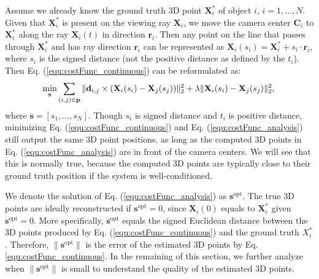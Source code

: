 Assume we already know the ground truth 3D point $\mathbf{{X}}_i^*$ of object $i$, $i=1,\dots,N$. Given that $\mathbf{{X}}_i^*$ is present on the viewing ray $\mathbf{X}_i$, we move the camera center $\mathbf{C}_i$ to $\mathbf{X}_i^*$ along the ray $\mathbf{X}_i(t)$ in direction $\mathbf{r}_i$. Then any point on the line that passes through $\mathbf{X}_i^*$ and has ray direction $\mathbf{r}_i$ can be represented as $\mathbf{X}_i (s_i)= \mathbf{X}_i^* + s_i \cdot \mathbf{r}_i$, where $s_i$ is the signed distance (not the positive distance as defined by the $t_i$). Then Eq. (\ref{equ:costFunc_continuous}) can be reformulated as:
\begin{equation}
\label{equ:costFunc_analysis}
\underset{\mathbf{s}} { \text{min} }
\sum_{(i,j)\in{\mathbf{p}}}{\|\mathbf{d}_{i,j}\times(\mathbf{X}_i(s_i)-\mathbf{X}_j(s_j))\|_2^2 + \lambda\|\mathbf{X}_i(s_i)-\mathbf{X}_j(s_j)\|_2^2}, \\
\end{equation}
where $\mathbf{s}=[s_1, \dots, s_N]$. Though $s_i$ is signed distance and $t_i$ is positive distance, minimizing Eq. (\ref{equ:costFunc_continuous}) and Eq. (\ref{equ:costFunc_analysis}) still output the same 3D point positions, as long as the computed 3D points in Eq. (\ref{equ:costFunc_analysis}) are in front of the camera centers. We will see that this is normally true, because the computed 3D points are typically close to their ground truth position if the system is well-conditioned.

We denote the solution of Eq. (\ref{equ:costFunc_analysis}) as $\mathbf{s}^\text{opt}$. The true 3D points are ideally reconstructed if $\mathbf{s}^\text{opt}=0$, since $\mathbf{X}_i(0)$ equals to $\mathbf{{X}}_i^*$ given $\mathbf{s}^\text{opt}=0$.
More specifically, $\mathbf{s}^\text{opt}$ equals the signed Euclidean distance between the 3D points produced by Eq. (\ref{equ:costFunc_continuous}) and the ground truth $X_i^*$.
Therefore, $\|\mathbf{s}^\text{opt}\|$ is the error of the estimated 3D points by Eq. \ref{equ:costFunc_continuous}.
In the remaining of this section, we further analyze when $\|\mathbf{s}^\text{opt}\|$ is small to understand the quality of the estimated 3D points. %

